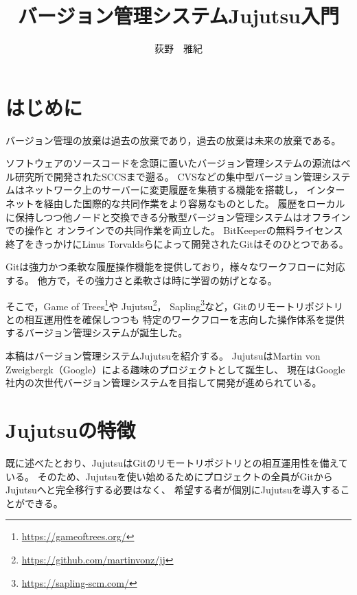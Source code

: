 \documentclass[b5j,twocolumn]{ltjsarticle}
\title{バージョン管理システムJujutsu入門}
\author{荻野　雅紀}
\date{}
\begin{document}
\pagestyle{empty}
\maketitle

\section{はじめに}

バージョン管理の放棄は過去の放棄であり，過去の放棄は未来の放棄である。

ソフトウェアのソースコードを念頭に置いたバージョン管理システムの源流はベル研究所で開発されたSCCSまで遡る。
CVSなどの集中型バージョン管理システムはネットワーク上のサーバーに変更履歴を集積する機能を搭載し，
インターネットを経由した国際的な共同作業をより容易なものとした。
履歴をローカルに保持しつつ他ノードと交換できる分散型バージョン管理システムはオフラインでの操作と
オンラインでの共同作業を両立した。
BitKeeperの無料ライセンス終了をきっかけにLinus Torvaldsらによって開発されたGitはそのひとつである。

Gitは強力かつ柔軟な履歴操作機能を提供しており，様々なワークフローに対応する。
他方で，その強力さと柔軟さは時に学習の妨げとなる。

そこで，Game of Trees\footnote{\url{https://gameoftrees.org/}}や
Jujutsu\footnote{\url{https://github.com/martinvonz/jj}}，
Sapling\footnote{\url{https://sapling-scm.com/}}など，Gitのリモートリポジトリとの相互運用性を確保しつつも
特定のワークフローを志向した操作体系を提供するバージョン管理システムが誕生した。

本稿はバージョン管理システムJujutsuを紹介する。
JujutsuはMartin von Zweigbergk（Google）による趣味のプロジェクトとして誕生し、
現在はGoogle社内の次世代バージョン管理システムを目指して開発が進められている。

\newpage

\section{Jujutsuの特徴}

既に述べたとおり、JujutsuはGitのリモートリポジトリとの相互運用性を備えている。
そのため、Jujutsuを使い始めるためにプロジェクトの全員がGitからJujutsuへと完全移行する必要はなく、
希望する者が個別にJujutsuを導入することができる。
\end{document}
